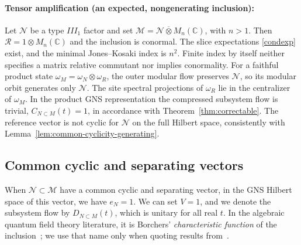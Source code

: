 \documentclass[a4paper,11pt]{article}
\theoremstyle{definition}
\newcommand{\mN}{\mathcal{N}}
\newcommand{\mM}{\mathcal{M}}
\begin{document}
\paragraph{Tensor amplification (an expected, nongenerating inclusion):}
Let $\mathcal N$ be a type $III_1$ factor and set $\mathcal M=\mathcal N\overline\otimes M_n(\mathbb C)$,
with $n>1$. Then $\mathcal R=1\otimes M_n(\mathbb C)$ and the inclusion is conormal.
The slice expectations \eqref{condexp} exist, and the minimal Jones--Kosaki index
is $n^2$. Finite index by itself neither specifies a matrix relative commutant
nor implies conormality.
For a faithful product state $\omega_M=\omega_N\otimes\omega_R$, the outer modular
flow preserves $\mathcal N$, so its modular orbit generates only $\mathcal N$.
The site spectral projections of $\omega_R$ lie in the centralizer of $\omega_M$.
In the product GNS representation the compressed subsystem flow is trivial, $C_{N\subset M}(t)=1$, in accordance with Theorem~\ref{thm:correctable}. The reference vector is not cyclic for $\mathcal N$ on the full Hilbert
space, consistently with Lemma~\ref{lem:common-cyclicity-generating}.





\subsection{Common cyclic and separating vectors}\label{subsec:common-cyclic}

When $\mN\subset \mM$ have a common cyclic and separating vector, in the GNS Hilbert space of this vector, we have $e_N=1$. We can set $V=1$, and we denote the subsystem flow by $D_{N\subset M}(t)$, which is unitary for all real $t$.  In the algebraic quantum field theory literature, it is Borchers' \emph{characteristic function} of the inclusion~\cite{revolutionizing}; we use that name only when quoting results from~\cite{revolutionizing}.
\end{document}
